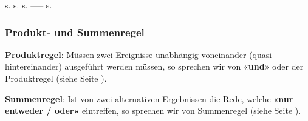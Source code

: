 {\hspace{18mm}
s. \pageref{kombiVariationMitZuruecklegen}\hspace{19mm}
s. \pageref{kombiVariationOhneWiederholung}\hspace{19mm}
s. \pageref{kombiVariationEinerTeilmenge}\hspace{17mm}
 ----- \hspace{30mm}
s. \pageref{kombiKombination}
}


\subsubsection{Produkt- und Summenregel}

\textbf{Produktregel}: Müssen zwei Ereignisse unabhängig voneinander
(quasi hintereinander) ausgeführt werden müssen, so sprechen wir von
«\textbf{und}» oder der Produktregel (siehe Seite \pageref{experimentePfadUndSummenregel}).

\textbf{Summenregel}: Ist von zwei alternativen Ergebnissen die Rede,
welche «\textbf{nur entweder / oder»} eintreffen, so sprechen wir von
Summenregel (siehe Seite \pageref{experimentePfadUndSummenregel}).
